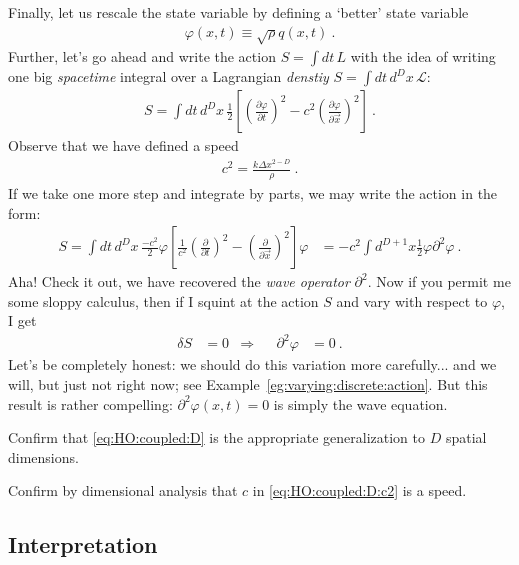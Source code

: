 Finally, let us rescale the state variable by defining a `better' state variable
\begin{align}
	\varphi(x,t) \equiv {\sqrt{\rho}}{q(x,t)} \ .
	\label{eq:field:normalization}
\end{align}
Further, let's go ahead and write the action $S=\int dt \, L$ with the idea of writing one big \emph{spacetime} integral over a Lagrangian \emph{denstiy} $S = \int dt\, d^Dx \, \mathcal L$:
\begin{align}
	S = \int dt \, d^Dx \,
	\frac{1}{2}
	\left[
	\left( 
		\frac{\partial \varphi}{\partial t}
		\right)^2
	- 
	c^2
	\left(\frac{\partial \varphi}{\partial \vec{x} }\right)^2
	\right] \ .
\end{align}
Observe that we have defined a speed
\begin{align}
	c^2 = \frac{k \Delta x^{2-D}}{\rho} \ .
	\label{eq:HO:coupled:D:c2}
\end{align}
If we take one more step and integrate by parts, we may write the action in the form:
\begin{align}
	S = \int dt \, d^Dx \,
	\frac{-c^2}{2}
	\varphi
	\left[
	\frac{1}{c^2}
	\left( 
		\frac{\partial}{\partial t}
		\right)^2
	- 
	\left(\frac{\partial }{\partial \vec{x} }\right)^2
	\right]
	\varphi 
	&=
	-c^2 \int d^{D+1}x \frac{1}{2} \varphi \partial^2 \varphi 
	\ .
\end{align}
Aha! Check it out, we have recovered the \emph{wave operator} $\partial^2$.  Now if you permit me some sloppy calculus, then if I squint at the action $S$ and vary with respect to $\varphi$, I get 
\begin{align}
	\delta S &=0 
	&\Rightarrow&&
	\partial^2 \varphi &= 0 \ .
	\label{eq:delta:S:operator:phi}
\end{align}
Let's be completely honest: we should do this variation more carefully... and we will, but just not right now; see Example~\ref{eg:varying:discrete:action}. But this result is rather compelling: $\partial^2\varphi(x,t) = 0$ is simply the wave equation.
\begin{exercise}
Confirm that \eqref{eq:HO:coupled:D} is the appropriate generalization to $D$ spatial dimensions.
\end{exercise}
\begin{exercise}
Confirm by dimensional analysis that $c$ in \eqref{eq:HO:coupled:D:c2} is a speed.
\end{exercise}

\subsection{Interpretation}

